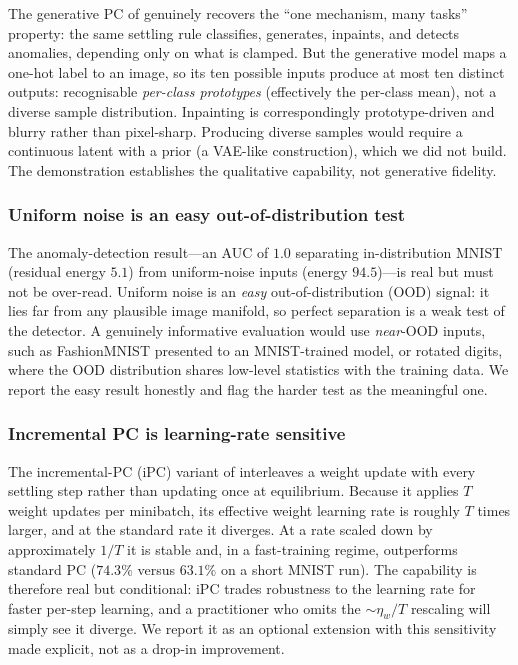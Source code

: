 The generative PC of  genuinely recovers the ``one mechanism, many
tasks'' property: the same settling rule classifies, generates, inpaints, and detects
anomalies, depending only on what is clamped. But the generative model maps a
one-hot label to an image, so its ten possible inputs produce at most ten distinct
outputs: recognisable \emph{per-class prototypes} (effectively the per-class mean),
not a diverse sample distribution. Inpainting is correspondingly prototype-driven and
blurry rather than pixel-sharp. Producing diverse samples would require a continuous
latent with a prior (a VAE-like construction), which we did not build. The
demonstration establishes the qualitative capability, not generative fidelity.

\subsubsection{Uniform noise is an easy out-of-distribution test}

The anomaly-detection result---an AUC of $1.0$ separating in-distribution MNIST
(residual energy $5.1$) from uniform-noise inputs (energy $94.5$)---is real but must
not be over-read. Uniform noise is an \emph{easy} out-of-distribution (OOD) signal:
it lies far from any plausible image manifold, so perfect separation is a weak test
of the detector. A genuinely informative evaluation would use \emph{near}-OOD inputs,
such as FashionMNIST presented to an MNIST-trained model, or rotated digits, where
the OOD distribution shares low-level statistics with the training data. We report
the easy result honestly and flag the harder test as the meaningful one.

\subsubsection{Incremental PC is learning-rate sensitive}

The incremental-PC (iPC) variant \citep{salvatori2024ipc} of 
interleaves a weight update with every settling step rather than updating once at
equilibrium. Because it applies $T$ weight updates per minibatch, its effective
weight learning rate is roughly $T$ times larger, and at the standard rate it
diverges. At a rate scaled down by approximately $1/T$ it is stable and, in a
fast-training regime, outperforms standard PC ($74.3\%$ versus $63.1\%$ on a short
MNIST run). The capability is therefore real but conditional: iPC trades robustness
to the learning rate for faster per-step learning, and a practitioner who omits the
$\sim\!\eta_w/T$ rescaling will simply see it diverge. We report it as an optional
extension with this sensitivity made explicit, not as a drop-in improvement.

